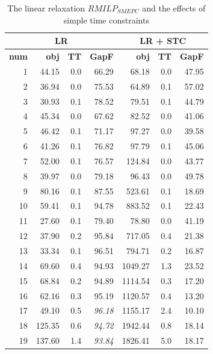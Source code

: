 \documentclass[11pt]{article}
\theoremstyle{plain}%
\theoremstyle{definition} \newtheorem{lem}{Lemma}[section]
\theoremstyle{definition} \newtheorem{claim}{Claim}[lem]
\theoremstyle{definition} \newtheorem{theorem}{Theorem}[section]
\theoremstyle{definition} \newtheorem{exo}{Exercice n$^\circ$}
\theoremstyle{definition} \newtheorem{quest}{}[exo]
\theoremstyle{definition} \newtheorem{sousquest}{}[quest]
\theoremstyle{remark}
\theoremstyle{definition}
\begin{document}
\begin{table}[H]
  \centering
	\small
  \caption{The linear relaxation $RMILP_{SMEPC}$ and the effects of simple time constraints}
		\begin{tabular}{|r|rrr|rrr|}
    \toprule
    \multicolumn{4}{c}{\textbf{LR}}              & \multicolumn{3}{c}{\textbf{LR + STC}} \\
    \midrule
    \textbf{num} & \textbf{obj} & \textbf{TT} & \textbf{GapF} & \multicolumn{1}{r}{ \textbf{obj}} & \textbf{TT} & \textbf{GapF} \\
    \midrule
    1     & 44.15 & 0.0      & 66.29 & 68.18 & 0.0      & 47.95 \\
    2     & 36.94 & 0.0        & 75.53 & 64.89 & 0.1       & 57.02 \\
    3     & 30.93 & 0.1       & 78.52 & 79.51 & 0.1       & 44.79 \\
    4     & 45.34 & 0.0       & 67.62 & 82.52 & 0.0       & 41.06 \\
    5     & 46.42 & 0.1       & 71.17 & 97.27 & 0.0     & 39.58 \\
    6     & 41.26 & 0.1       & 76.82 & 97.79 & 0.1     & 45.06 \\
    7     & 52.00 & 0.1      & 76.57 & 124.84 & 0.0       & 43.77 \\
    8     & 39.97 & 0.0      & 79.18 & 96.43 & 0.0     & 49.78 \\
    9     & 80.16 & 0.1     & 87.55 & 523.61 & 0.1    & 18.69 \\
    10    & 59.41 & 0.1       & 94.78 & 883.52 & 0.1      & 22.43 \\
    11    & 27.60 & 0.1      & 79.40 & 78.80 & 0.0       & 41.19 \\
    12    & 37.90 & 0.2     & 95.84 & 717.05 & 0.4      & 21.38 \\
    13    & 33.34 & 0.1     & 96.51 & 794.71 & 0.2      & 16.87 \\
    14    & 69.60 & 0.4     & 94.93 & 1049.27 & 1.3      & 23.52 \\
    15    & 68.84 & 0.2      & 94.89 & 1114.54 & 0.3     & 17.20 \\
    16    & 62.16 & 0.3       & 95.19 & 1120.57 & 0.4      & 13.20 \\
    17    & 49.10 & 0.5      &\it{ 96.18} & 1155.17 & 2.4       &  10.10 \\
    18    & 125.35 & 0.6       & \it{ 94.72} & 1942.44 & 0.8       &  18.14 \\
    19    & 137.60 & 1.4     & \it{ 93.84 }& 1826.41 & 5.0       &  18.17 \\

\end{tabular}
\end{table}
\end{document}
